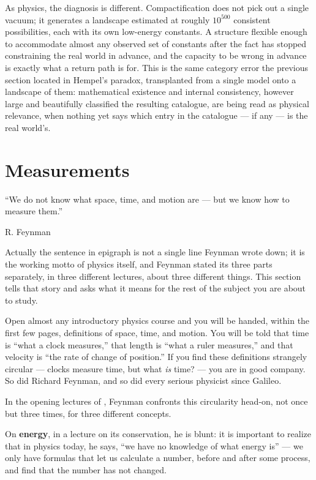 As physics, the diagnosis is different. Compactification does not pick out a
single vacuum; it generates a landscape estimated at roughly $10^{500}$
consistent possibilities, each with its own low-energy constants. A structure
flexible enough to accommodate almost any observed set of constants after the
fact has stopped constraining the real world in advance, and the capacity to be
wrong in advance is exactly what a return path is for. This is the same
category error the previous section located in Hempel's paradox, transplanted
from a single model onto a landscape of them: mathematical existence and
internal consistency, however large and beautifully classified the resulting
catalogue, are being read as physical relevance, when nothing yet says which
entry in the catalogue --- if any --- is the real world's.

\section{Measurements}
\label{rm:me}

\epigraph{``We do not know what space, time, and motion are --- 
but we know how to measure them.''}{R. Feynman}

Actually the sentence in epigraph  is not a single line Feynman wrote down; it
is the working motto of physics itself, and Feynman stated its three parts
separately, in three different lectures, about three different things. This
section tells that story and asks what it means for the rest of the subject you
are about to study.

Open almost any introductory physics course and you will be handed, within the
first few pages, definitions of space, time, and motion. You will be told that
time is ``what a clock measures,'' that length is ``what a ruler measures,''
and that velocity is ``the rate of change of position.'' If you find these
definitions strangely circular --- clocks measure time, but what \emph{is}
time? --- you are in good company. So did Richard Feynman, and so did every
serious physicist since Galileo.

In the opening lectures of \cite{flp1}, Feynman
confronts this circularity head-on, not once but three times, for three
different concepts.

On \textbf{energy}, in a lecture on its conservation, he is blunt: it is
important to realize that in physics today, he says, ``we have no knowledge of
what energy is'' --- we only have formulas that let us calculate a number,
before and after some process, and find that the number has not changed.

